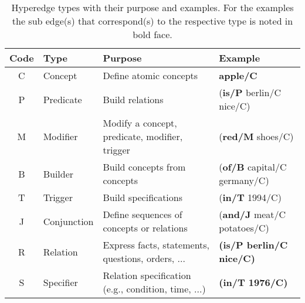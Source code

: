\documentclass[11pt]{scrreprt}
\begin{document}
\begin{table}[h]
\centering
\begin{tabular}{clp{5cm}l}
\toprule
\textbf{Code} & \textbf{Type} & \textbf{Purpose} & \textbf{Example} \\
\midrule
\textsf{C} & Concept & Define atomic concepts & \textbf{\textsf{apple/C}} \\
\textsf{P} & Predicate & Build relations & \textsf{(\textbf{is/P} berlin/C nice/C)} \\
\textsf{M} & Modifier & Modify a concept, predicate, modifier, trigger & \textsf{(\textbf{red/M} shoes/C)} \\
\textsf{B} & Builder & Build concepts from concepts & \textsf{(\textbf{of/B} capital/C germany/C)} \\
\textsf{T} & Trigger & Build specifications & \textsf{(\textbf{in/T} 1994/C)} \\
\textsf{J} & Conjunction & Define sequences of concepts or relations & \textsf{(\textbf{and/J} meat/C potatoes/C)} \\
\textsf{R} & Relation & Express facts, statements, questions, orders, ... & \textsf{\textbf{(is/P berlin/C nice/C)}} \\
\textsf{S} & Specifier & Relation specification (e.g., condition, time, ...) & \textsf{\textbf{(in/T 1976/C)}} \\
\bottomrule
\end{tabular}
\caption{Hyperedge types with their purpose and examples. For the examples the sub edge(s) that correspond(s) to the respective type is noted in bold face.}
\label{tab:hyperedge-types}
\end{table}

\end{document}
